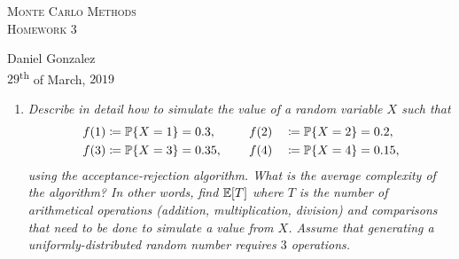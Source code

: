 \documentclass{article}
\newcommand{\defn}{\coloneqq}
\newcommand{\E}[1]{\mathbb{E}\sqparens*{#1}}
\DeclarePairedDelimiter \set{\lbrace}{\rbrace}
\DeclarePairedDelimiter \sqparens{[}{]}
\begin{document}
\begin{center}
    \textsc{\huge Monte Carlo Methods}\\
    \textsc{\Large Homework 3}\\
\end{center}
\begin{flushright}
    Daniel Gonzalez\\
    $29$\textsuperscript{th} of March, $2019$
\end{flushright}

\begin{enumerate}
    \item \label{1}
        {\it Describe in detail how to simulate the value of a random variable $X$ such that
        \begin{alignat*}{3}
            f(1) &\defn \mathbb{P}\set*{X = 1} = 0.3,  ~~~~&&f(2) &&\defn \mathbb{P}\set*{X = 2} = 0.2,\\
            f(3) &\defn \mathbb{P}\set*{X = 3} = 0.35, ~~~~&&f(4) &&\defn \mathbb{P}\set*{X = 4} = 0.15,
        \end{alignat*}
        using the acceptance-rejection algorithm. What is the average complexity of the algorithm?
        In other words, find $\E{T}$ where $T$ is the number of arithmetical operations (addition, multiplication, division) and comparisons
        that need to be done to simulate a value from $X$. Assume that generating a uniformly-distributed random number requires $3$ operations.}


\end{enumerate}
\end{document}
